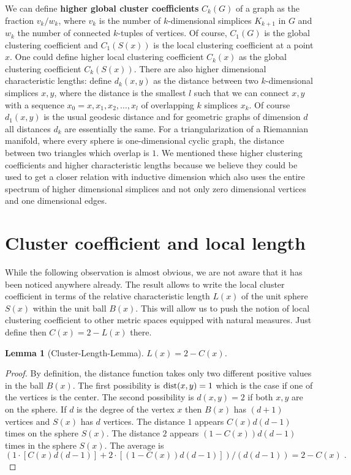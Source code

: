 \documentclass[12pt]{amsart}
\newtheorem{lemma}[thm]{Lemma}
\theoremstyle{definition}
\begin{document}
We can define {\bf higher global cluster coefficients} $C_k(G)$ of a graph 
as the fraction $v_k/w_k$, where $v_k$ is the number of $k$-dimensional
simplices $K_{k+1}$ in $G$ and $w_k$ the number of connected $k$-tuples of 
vertices. Of course, $C_1(G)$ is the global clustering coefficient
and $C_1(S(x))$ is the local clustering coefficient at a point $x$. 
One could define higher local clustering coefficient $C_k(x)$ as the 
global clustering coefficient $C_k(S(x))$. There are also higher dimensional 
characteristic lengths: define $d_k(x,y)$ as the distance between two 
$k$-dimensional simplices $x,y$, where the distance is the smallest
$l$ such that we can connect $x,y$ with a sequence $x_0=x,x_1,x_2,\dots,x_l$ 
of overlapping $k$ simplices $x_k$. Of course $d_1(x,y)$ is the usual
geodesic distance and for geometric graphs of dimension $d$ all distances
$d_k$ are essentially the same. For a triangularization of a Riemannian 
manifold, where every sphere is one-dimensional cyclic graph, the distance
between two triangles which overlap is $1$.
We mentioned these higher clustering coefficients and higher characteristic lengths
because we believe they could be used to get a closer relation with 
inductive dimension which also uses the entire spectrum of higher dimensional 
simplices and not only zero dimensional vertices and one dimensional edges. 

\section{Cluster coefficient and local length}

While the following observation is almost obvious, we are not aware
that it has been noticed anywhere already. The result allows to write the 
local cluster coefficient in terms of the relative characteristic length $L(x)$ 
of the unit sphere $S(x)$ within the unit ball $B(x)$. This will allow
us to push the notion of local clustering coefficient to other metric spaces 
equipped with natural measures. Just define then $C(x) =2-L(x)$ there. 

\begin{lemma}[Cluster-Length-Lemma]
$L(x) = 2-C(x)$. 
\end{lemma}

\begin{proof}
By definition, the distance function takes only two different positive values in the ball $B(x)$. 
The first possibility is ${\rm dist}(x,y)=1$ which is the case if one of the vertices is the center.
The second possibility is $d(x,y)=2$ if both $x,y$ are on the sphere. 
If $d$ is the degree of the vertex $x$ then $B(x)$ has $(d+1)$ vertices and $S(x)$ has
$d$ vertices. The distance $1$ appears $C(x) d(d-1)$ times on the sphere $S(x)$. 
The distance $2$ appears $(1-C(x)) d (d-1)$ times in the sphere $S(x)$. The average is 
$$  (1 \cdot[ C(x) d (d-1) ] + 2 \cdot [ (1-C(x)) d (d-1) ] ) /(d (d-1)) = 2- C(x)  \; .  $$
\end{proof} 
\end{document}
